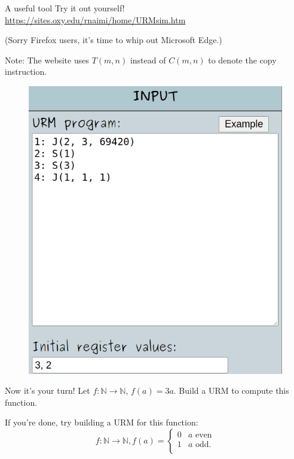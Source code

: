 \documentclass{beamer}
\begin{document}
\begin{frame}{A useful tool}
\vspace{2mm}
Try it out yourself! \url{https://sites.oxy.edu/rnaimi/home/URMsim.htm}

\tiny

(Sorry Firefox users, it's time to whip out Microsoft Edge.)

Note: The website uses $T(m, n)$ instead of $C(m, n)$ to denote the copy instruction.

\begin{figure}
\includegraphics[scale=0.25]{img/ss1.png}
\end{figure}
\end{frame}

\begin{frame}{Now it's your turn!}
Let $f: \mathbb N \to \mathbb N$, $f(a) = 3a$. Build a URM to compute this function.

\vspace{6mm}

\small If you're done, try building a URM for this function:
$$f: \mathbb N \to \mathbb N, f(a) = \begin{cases}
0 & \text{$a$ even}\\
1 & \text{$a$ odd.}\\
\end{cases}$$
\end{frame}
\end{document}
